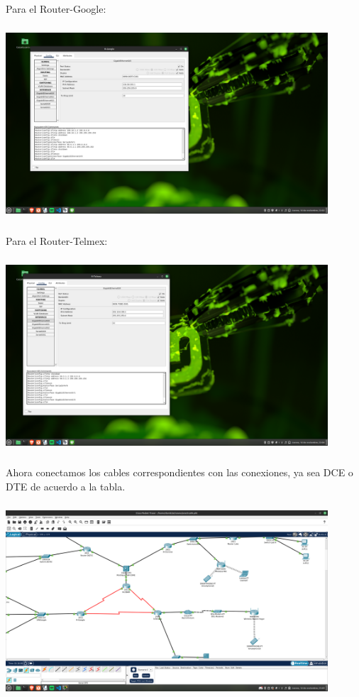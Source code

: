 \documentclass[14pt]{book}
\begin{document}
Para el Router-Google:\\

\includegraphics[width=12cm, height=8cm]{images/ruouter googlee.png}\\

Para el Router-Telmex:\\

\includegraphics[width=12cm, height=8cm]{images/R-TELMEX.png}\\

Ahora conectamos los cables correspondientes con las conexiones, ya sea DCE o DTE de acuerdo a la tabla.\\

\includegraphics[width=12cm, height=8cm]{images/rojos.png}\\
\end{document}

